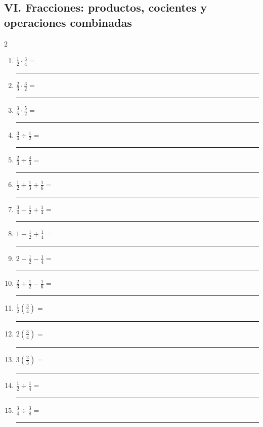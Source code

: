 \documentclass[11pt]{article}
\begin{document}
\subsection*{VI. Fracciones: productos, cocientes y operaciones combinadas}
\begin{multicols}{2}\begin{enumerate}[leftmargin=*,start=66]
\item $\displaystyle \frac12\cdot\frac34=$ \rule{2.2cm}{0.4pt}
\item $\displaystyle \frac23\cdot\frac32=$ \rule{2.2cm}{0.4pt}
\item $\displaystyle \frac35\cdot\frac52=$ \rule{2.2cm}{0.4pt}
\item $\displaystyle \frac34\div\frac12=$ \rule{2.2cm}{0.4pt}
\item $\displaystyle \frac23\div\frac43=$ \rule{2.2cm}{0.4pt}
\item $\displaystyle \frac12+\frac13+\frac16=$ \rule{2.2cm}{0.4pt}
\item $\displaystyle \frac34-\frac12+\frac14=$ \rule{2.2cm}{0.4pt}
\item $\displaystyle 1-\frac12+\frac14=$ \rule{2.2cm}{0.4pt}
\item $\displaystyle 2-\frac12-\frac14=$ \rule{2.2cm}{0.4pt}
\item $\displaystyle \frac23+\frac12-\frac16=$ \rule{2.2cm}{0.4pt}
\item $\displaystyle \frac12\left(\frac34\right)=$ \rule{2.2cm}{0.4pt}
\item $\displaystyle 2\left(\frac34\right)=$ \rule{2.2cm}{0.4pt}
\item $\displaystyle 3\left(\frac23\right)=$ \rule{2.2cm}{0.4pt}
\item $\displaystyle \frac12\div\frac14=$ \rule{2.2cm}{0.4pt}
\item $\displaystyle \frac34\div\frac38=$ \rule{2.2cm}{0.4pt}
\end{enumerate}\end{multicols}
\end{document}

